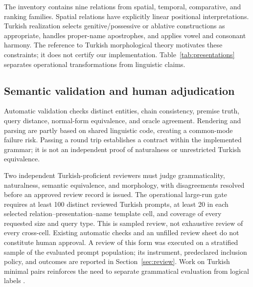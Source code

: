 The inventory contains nine relations from spatial, temporal, comparative, and ranking families. Spatial
relations have explicitly linear positional interpretations. Turkish realization selects
genitive/possessive or ablative constructions as appropriate, handles proper-name apostrophes, and applies
vowel and consonant harmony. The reference to Turkish morphological theory \citep{oflazer1994turkish}
motivates these constraints; it does not certify our implementation. Table~\ref{tab:presentations}
separates operational transformations from linguistic claims.

\subsection{Semantic validation and human adjudication}

Automatic validation checks distinct entities, chain consistency, premise truth, query distance,
normal-form equivalence, and oracle agreement. Rendering and parsing are partly based on shared linguistic
code, creating a common-mode failure risk. Passing a round trip establishes a contract within the
implemented grammar; it is not an independent proof of naturalness or unrestricted Turkish equivalence.

Two independent Turkish-proficient reviewers must judge grammaticality, naturalness, semantic equivalence,
and morphology, with disagreements resolved before an approved review record is issued. The operational
large-run gate requires at least 100 distinct reviewed Turkish prompts, at least 20 in each selected
relation--presentation--name template cell, and coverage of every requested size and query type. This is
sampled review, not exhaustive review of every cross-cell. Existing automatic checks and an unfilled review
sheet do not constitute human approval. A review of this form was executed on a stratified sample of the
evaluated prompt population; its instrument, predeclared inclusion policy, and outcomes are reported in
Section~\ref{sec:review}. Work on Turkish minimal pairs reinforces the need to separate
grammatical evaluation from logical labels \citep{basar2025turblimp, basar2026morphologyaware}.

